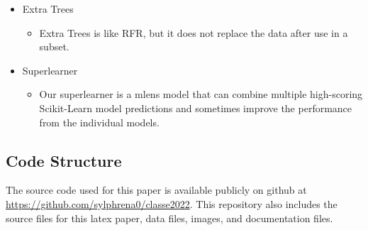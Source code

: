 \documentclass[twocolumn, nofootinbib, secnumarabic, amssymb, nobibnotes, aps, prd]{revtex4-2}
\begin{document}
\begin{itemize}
  \item Extra Trees
  \begin{itemize}
  		\item Extra Trees is like RFR, but it does not replace the data after use in a subset.
  \end{itemize}
  \item Superlearner
  \begin{itemize}
  		\item Our superlearner is a mlens model that can combine multiple high-scoring Scikit-Learn model predictions and sometimes improve the performance from the individual models.
  \end{itemize}
\end{itemize}




\subsection{Code Structure} %
The source code used for this paper is available publicly on github at \url{https://github.com/sylphrena0/classe2022}. This repository also includes the source files for this latex paper, data files, images, and documentation files.
\end{document}
